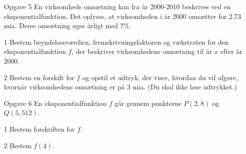 \documentclass[12pt,x11names,a4paper]{article}
\begin{document}
\begin{opgavetekst}{Opgave 5}
	En virksomheds omsætning kan fra år 2000-2010 beskrives ved en eksponentialfunktion. Det oplyses, at virksomheden
	i år 2000 omsætter for 2.73 mia. Deres omsætning øges årligt med $7\%$. 
\end{opgavetekst}
\begin{delopgave}{}{1}
	Bestem beyndelsesværdien, fremskrivningsfaktoren og vækstraten for den eksponentialfunktion $f$, der beskriver 
	virksomhedens omsætning til år $x$ efter år 2000.
\end{delopgave}
\begin{delopgave}{}{2}
	Bestem en forskift for $f$ og opstil et udtryk, der viser, hvordan du vil afgøre, hvornår virksomhedens omsætning er
	på $3$ mia. (Du skal ikke løse udtrykket.)
\end{delopgave}
\begin{opgavetekst}{Opgave 6}
	En eksponentialfunktion $f$ går gennem punkterne $P(2,8)$ og $Q(5,512)$. 
\end{opgavetekst}
\begin{delopgave}{}{1}
	Bestem forskriften for $f$. 
\end{delopgave}
\begin{delopgave}{}{2}
	Bestem $f(4)$.
\end{delopgave}
\end{document}
